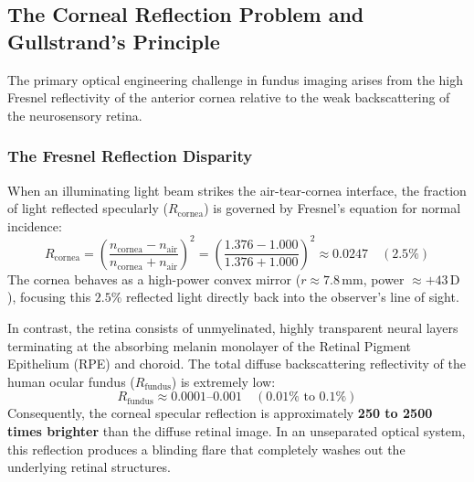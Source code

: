 \documentclass[11pt,a4paper]{article}
\begin{document}
\subsection{The Corneal Reflection Problem and Gullstrand's Principle}

The primary optical engineering challenge in fundus imaging arises from the high Fresnel reflectivity of the anterior cornea relative to the weak backscattering of the neurosensory retina.

\subsubsection{The Fresnel Reflection Disparity}
When an illuminating light beam strikes the air-tear-cornea interface, the fraction of light reflected specularly ($R_{\text{cornea}}$) is governed by Fresnel's equation for normal incidence:
\begin{equation}
    R_{\text{cornea}} = \left( \frac{n_{\text{cornea}} - n_{\text{air}}}{n_{\text{cornea}} + n_{\text{air}}} \right)^2 = \left( \frac{1.376 - 1.000}{1.376 + 1.000} \right)^2 \approx 0.0247 \quad (2.5\%)
\end{equation}
The cornea behaves as a high-power convex mirror ($r \approx 7.8\,\text{mm}$, power $\approx +43\,\text{D}$), focusing this $2.5\%$ reflected light directly back into the observer's line of sight.

In contrast, the retina consists of unmyelinated, highly transparent neural layers terminating at the absorbing melanin monolayer of the Retinal Pigment Epithelium (RPE) and choroid. The total diffuse backscattering reflectivity of the human ocular fundus ($R_{\text{fundus}}$) is extremely low:
\begin{equation}
    R_{\text{fundus}} \approx 0.0001\text{--}0.001 \quad (0.01\%\text{ to }0.1\%)
\end{equation}
Consequently, the corneal specular reflection is approximately \textbf{250 to 2500 times brighter} than the diffuse retinal image. In an unseparated optical system, this reflection produces a blinding flare that completely washes out the underlying retinal structures.
\end{document}
